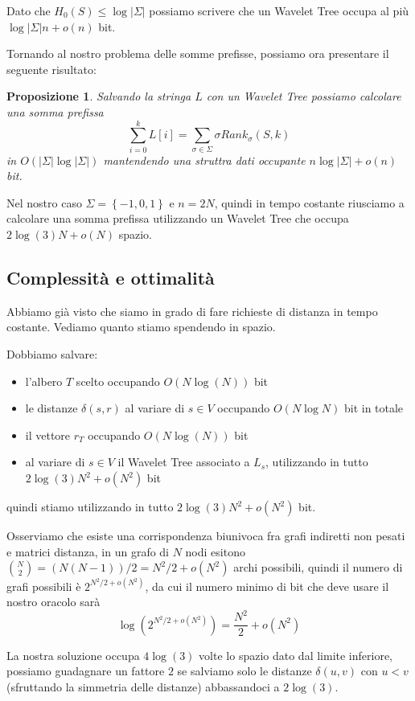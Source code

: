 \documentclass[a4paper,10pt]{amsbook}
\newcounter{counter1}
\theoremstyle{plain}
\newtheorem{mypro}[counter1]{Proposizione}
\theoremstyle{definition}
\theoremstyle{remark}
\newcommand{\set}[1]{\left\{#1\right\}}
\newcommand{\pa}[1]{\left(#1\right)}
\newcommand{\abs}[1]{\left|#1\right|}
\begin{document}
Dato che $H_0(S) \le \log \abs{\Sigma}$ possiamo scrivere che un
Wavelet Tree occupa al pi\`u $\log \abs{\Sigma} n + o(n)$ bit.

Tornando al nostro problema delle somme prefisse, possiamo ora
presentare il seguente risultato:
\begin{mypro}
  Salvando la stringa $L$ con un Wavelet Tree possiamo calcolare una
  somma prefissa
  \[ \sum _{i=0} ^ {k} L[i] = \sum _{\sigma \in \Sigma} \sigma Rank
  _\sigma (S,k) \] 
  in $O\pa{ \abs{\Sigma} \log \abs{\Sigma} }$ mantendendo una struttra
  dati occupante $n\log \abs{\Sigma} + o(n)$ bit.
\end{mypro}

Nel nostro caso $\Sigma = \set{ -1,0,1}$ e $n = 2N$, quindi in tempo
costante riusciamo a calcolare una somma prefissa utilizzando un
Wavelet Tree che occupa $2\log\pa{ 3} N + o(N)$ spazio.


\subsection{Complessit\`a e ottimalità}
\label{sec:oracoloesattoottimale}

Abbiamo gi\`a visto che siamo in grado di fare richieste di distanza
in tempo costante. Vediamo quanto stiamo spendendo in spazio.

Dobbiamo salvare:
\begin{itemize}
\item l'albero $T$ scelto occupando $O\pa{N\log\pa{N}}$ bit
\item le distanze $\delta\pa{s,r}$ al variare di $s\in V$ occupando
  $O\pa{ N \log N}$ bit in totale
\item il vettore $r_T$ occupando $O\pa{N \log\pa{N}}$ bit 
\item al variare di $s\in V$ il Wavelet Tree associato a $L_s$,
  utilizzando in tutto $2\log\pa{3} N^2 + o(N^2)$ bit
\end{itemize}
quindi stiamo utilizzando in tutto $2\log\pa{3} N^2 + o(N^2)$ bit.

Osserviamo che esiste una corrispondenza biunivoca fra grafi indiretti
non pesati e matrici distanza, in un grafo di $N$ nodi esitono
$\binom{N}{2} = \pa{N(N-1)}/{2} = N^2/2 + o(N^2)$ archi possibili,
quindi il numero di grafi possibili \`e $2^{N^2/2 + o(N^2)}$,
da cui il numero minimo di bit che deve usare il nostro oracolo sar\`a
\[ \log \pa{ 2^{N^2/2 + o(N^2)} } = \frac{N^2}{2} + o(N^2) \]

La nostra soluzione occupa $4 \log \pa{3}$ volte lo spazio dato dal
limite inferiore, possiamo guadagnare un fattore $2$ se salviamo solo
le distanze $\delta\pa{u,v}$ con $u<v$ (sfruttando la simmetria delle
distanze) abbassandoci a $2\log \pa{3}$.
\end{document}
